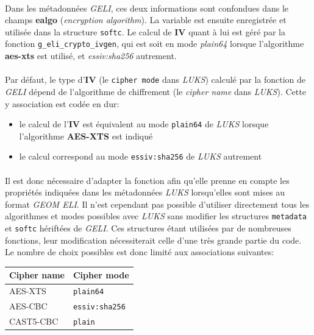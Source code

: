 \paragraph{}
Dans les métadonnées \textit{GELI}, ces deux informations sont confondues dans
le champs \textbf{ealgo} (\textit{encryption algorithm}). La variable est
ensuite enregistrée et utilisée dans la structure \texttt{softc}. Le calcul de
\textbf{IV} quant à lui est géré par la fonction \texttt{g\_eli\_crypto\_ivgen},
qui est soit en mode \textit{plain64} lorsque l'algorithme \textbf{aes-xts} est
utilisé, et \textit{essiv:sha256} autrement.
\paragraph{}
Par défaut, le type d'\textbf{IV} (le \texttt{cipher mode} dans \textit{LUKS})
calculé par la fonction de \textit{GELI} dépend de l'algorithme de chiffrement
(le \textit{cipher name} dans \textit{LUKS}). Cette y association est codée en
dur:
\begin{itemize}
\item le calcul de l'\textbf{IV} est équivalent au mode \texttt{plain64} de
  \textit{LUKS} lorsque l'algorithme \textbf{AES-XTS} est indiqué
\item le calcul correspond au mode \texttt{essiv:sha256} de \textit{LUKS}
  autrement
\end{itemize}
\paragraph{}
Il est donc nécessaire d'adapter la fonction afin qu'elle prenne en compte les
propriétés indiquées dans les métadonnées \textit{LUKS} lorsqu'elles sont mises
au format \textit{GEOM ELI}. Il n'est cependant pas possible d'utiliser
directement tous les algorithmes et modes possibles avec \textit{LUKS} sans
modifier les structures \texttt{metadata} et \texttt{softc} hériftées de
\textit{GELI}. Ces structures étant utilisées par de nombreuses fonctions, leur
modification nécessiterait celle d'une très grande partie du code. Le nombre de
choix possibles est donc limité aux associations suivantes:
\begin{center}
  \begin{tabular}{ | l | l | }
    \hline
    \textbf{Cipher name} & \textbf{Cipher mode}  \\
    \hline
    AES-XTS              & \texttt{plain64}      \\
    AES-CBC              & \texttt{essiv:sha256} \\
    CAST5-CBC            & \texttt{plain}        \\
    \hline
  \end{tabular}
\end{center}


